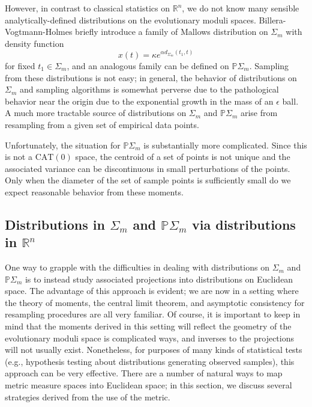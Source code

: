 \documentclass[a4paper,11pt]{article}
\newcommand{\CAT}{\textrm{CAT}}
\begin{document}
However, in contrast to classical statistics on $\mathbb{R}^n$, we do not know many sensible analytically-defined distributions on the evolutionary moduli spaces.
Billera-Vogtmann-Holmes briefly introduce a family of Mallows distribution on $\Sigma_m$ with density function
\[
x(t) = \kappa e^{\alpha d_{\Sigma_m}(t_1, t)}
\] 
for fixed $t_1 \in \Sigma_m$, and an analogous family can be defined on $\mathbb{P}\Sigma_m$.
Sampling from these distributions is not easy; in general, the behavior of distributions on $\Sigma_m$ and sampling algorithms is somewhat perverse due to the pathological behavior near the origin due to the exponential growth in the mass of an $\epsilon$ ball.
A much more tractable source of distributions on $\Sigma_m$ and $\mathbb{P}\Sigma_m$ arise from resampling from a given set of empirical data points.

Unfortunately, the situation for $\mathbb{P}\Sigma_m$ is substantially more complicated.
Since this is not a $\CAT(0)$ space, the centroid of a set of points is not unique and the associated variance can be discontinuous in small perturbations of the points.
Only when the diameter of the set of sample points is sufficiently small do we expect reasonable behavior from these moments.

\subsection{Distributions in $\Sigma_m$ and $\mathbb{P}\Sigma_m$ via distributions in $\mathbb{R}^n$}

One way to grapple with the difficulties in dealing with distributions on $\Sigma_m$ and $\mathbb{P}\Sigma_m$ is to instead study associated projections into distributions on Euclidean space.
The advantage of this approach is evident; we are now in a setting where the theory of moments, the central limit theorem, and asymptotic consistency for resampling procedures are all very familiar.
Of course, it is important to keep in mind that the moments derived in this setting will reflect the geometry of the evolutionary moduli space is complicated ways, and inverses to the projections will not usually exist.
Nonetheless, for purposes of many kinds of statistical tests (e.g., hypothesis testing about distributions generating observed samples), this approach can be very effective.
There are a number of natural ways to map metric measure spaces into Euclidean space; in this section, we discuss several strategies derived from the use of the metric.
\end{document}
